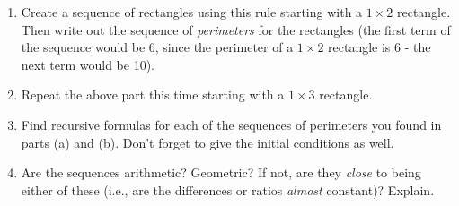 \documentclass[10pt,]{book}
\theoremstyle{plain}
\theoremstyle{definition}
\numberwithin{equation}{chapter}
\begin{document}
\begin{exerciselist}
\leavevmode%
\begin{figure}
\centering
{
}
\end{figure}
\leavevmode%
\begin{enumerate}[label=(\alph*)]
\item\hypertarget{li-532}{}
                        Create a sequence of rectangles using this rule starting with a \(1\times 2\) rectangle. Then write out the sequence of \emph{perimeters} for the rectangles (the first term of the sequence would be 6, since the perimeter of a \(1\times 2\) rectangle is 6 - the next term would be 10).


\item\hypertarget{li-533}{}
                        Repeat the above part this time starting with a \(1 \times 3\) rectangle.


\item\hypertarget{li-534}{}
                        Find recursive formulas for each of the sequences of perimeters you found in parts (a) and (b). Don't forget to give the initial conditions as well.


\item\hypertarget{li-535}{}
                        Are the sequences arithmetic? Geometric? If not, are they \emph{close} to being either of these (i.e., are the differences or ratios \emph{almost} constant)? Explain.



\end{enumerate}
\end{exerciselist}
\end{document}
